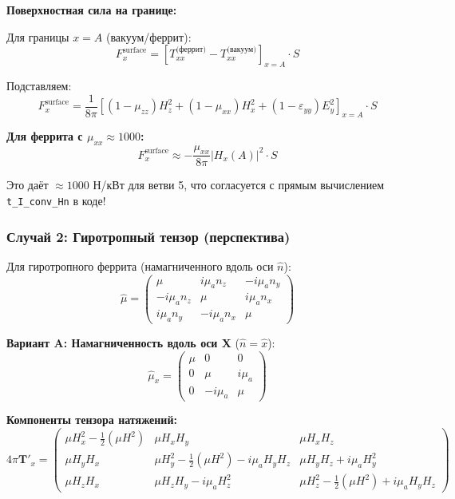 \documentclass[a4paper,12pt]{article}
\begin{document}
\textbf{Поверхностная сила на границе:}

Для границы $x = A$ (вакуум/феррит):
\begin{equation}
F_x^{\text{surface}} = \left[T_{xx}^{\text{(феррит)}} - T_{xx}^{\text{(вакуум)}}\right]_{x=A} \cdot S
\label{eq:surface_force}
\end{equation}

Подставляем:
\begin{equation}
\boxed{
F_x^{\text{surface}} = \frac{1}{8\pi}\left[(1-\mu_{zz})H_z^2 + (1-\mu_{xx})H_x^2 + (1-\varepsilon_{yy})E_y^2\right]_{x=A} \cdot S
}
\label{eq:surface_force_explicit}
\end{equation}

\textbf{Для феррита с $\mu_{xx} \approx 1000$:}
\begin{equation}
F_x^{\text{surface}} \approx -\frac{\mu_{xx}}{8\pi}|H_x(A)|^2 \cdot S
\label{eq:surface_force_ferrite}
\end{equation}

Это даёт $\approx 1000$ Н/кВт для ветви 5, что согласуется с прямым вычислением \texttt{t\_I\_conv\_Hn} в коде!

\subsubsection{Случай 2: Гиротропный тензор (перспектива)}

Для гиротропного феррита (намагниченного вдоль оси $\hat{n}$):
\begin{equation}
\hat{\mu} = \begin{pmatrix}
\mu & i\mu_a n_z & -i\mu_a n_y \\
-i\mu_a n_z & \mu & i\mu_a n_x \\
i\mu_a n_y & -i\mu_a n_x & \mu
\end{pmatrix}
\label{eq:gyrotropic_tensor}
\end{equation}

\textbf{Вариант A: Намагниченность вдоль оси X} ($\hat{n} = \hat{x}$):
\begin{equation}
\hat{\mu}_x = \begin{pmatrix}
\mu & 0 & 0 \\
0 & \mu & i\mu_a \\
0 & -i\mu_a & \mu
\end{pmatrix}
\label{eq:gyrotropic_x}
\end{equation}

\textbf{Компоненты тензора натяжений:}
\begin{equation}
\boxed{
4\pi\mathbf{T}'_x = \begin{pmatrix}
\mu H_x^2 - \frac{1}{2}(\mu H^2) & \mu H_x H_y & \mu H_x H_z \\
\mu H_y H_x & \mu H_y^2 - \frac{1}{2}(\mu H^2) - i\mu_a H_y H_z & \mu H_y H_z + i\mu_a H_y^2 \\
\mu H_z H_x & \mu H_z H_y - i\mu_a H_z^2 & \mu H_z^2 - \frac{1}{2}(\mu H^2) + i\mu_a H_y H_z
\end{pmatrix}
}
\label{eq:tensor_gyrotropic_x}
\end{equation}
\end{document}
